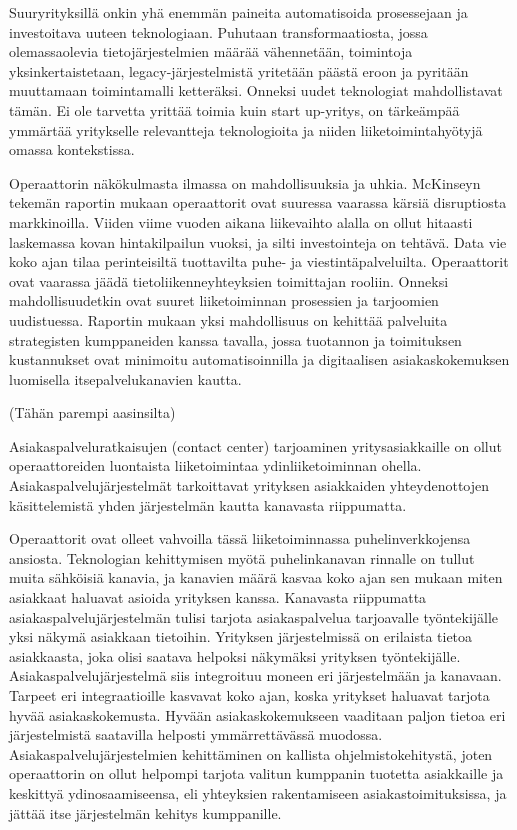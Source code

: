 \documentclass[finnish,12pt,a4paper,pdftex]{article}
\begin{document}
Suuryrityksillä onkin yhä enemmän paineita automatisoida prosessejaan ja investoitava uuteen teknologiaan. Puhutaan transformaatiosta, jossa olemassaolevia tietojärjestelmien määrää vähennetään, toimintoja yksinkertaistetaan,  legacy-järjestelmistä yritetään päästä eroon ja pyritään muuttamaan toimintamalli ketteräksi. Onneksi uudet teknologiat mahdollistavat tämän. Ei ole tarvetta yrittää toimia kuin start up-yritys, on tärkeämpää ymmärtää yritykselle relevantteja teknologioita ja niiden liiketoimintahyötyjä omassa kontekstissa. \citep{lamoureux}

Operaattorin näkökulmasta ilmassa on mahdollisuuksia ja uhkia. McKinseyn tekemän raportin mukaan operaattorit ovat suuressa vaarassa kärsiä disruptiosta markkinoilla. Viiden viime vuoden aikana liikevaihto alalla on ollut hitaasti laskemassa kovan hintakilpailun vuoksi, ja silti investointeja on tehtävä. Data vie koko ajan tilaa perinteisiltä tuottavilta puhe- ja viestintäpalveluilta. Operaattorit ovat vaarassa jäädä tietoliikenneyhteyksien toimittajan rooliin. Onneksi mahdollisuudetkin ovat suuret liiketoiminnan prosessien ja tarjoomien uudistuessa. Raportin mukaan yksi mahdollisuus on kehittää palveluita strategisten kumppaneiden kanssa tavalla, jossa tuotannon ja toimituksen kustannukset ovat minimoitu automatisoinnilla ja digitaalisen asiakaskokemuksen luomisella itsepalvelukanavien kautta.\citep{mckinseytele}

(Tähän parempi aasinsilta)

Asiakaspalveluratkaisujen (contact center) tarjoaminen yritysasiakkaille on ollut operaattoreiden luontaista liiketoimintaa ydinliiketoiminnan ohella. Asiakaspalvelujärjestelmät tarkoittavat yrityksen asiakkaiden yhteydenottojen käsittelemistä yhden järjestelmän kautta kanavasta riippumatta.

Operaattorit ovat olleet vahvoilla tässä liiketoiminnassa puhelinverkkojensa ansiosta. Teknologian kehittymisen myötä puhelinkanavan rinnalle on tullut muita sähköisiä kanavia, ja kanavien määrä kasvaa koko ajan sen mukaan miten asiakkaat haluavat asioida yrityksen kanssa. Kanavasta riippumatta asiakaspalvelujärjestelmän tulisi tarjota asiakaspalvelua tarjoavalle työntekijälle yksi näkymä asiakkaan tietoihin. Yrityksen järjestelmissä on erilaista tietoa asiakkaasta, joka olisi saatava helpoksi näkymäksi yrityksen työntekijälle. Asiakaspalvelujärjestelmä siis integroituu moneen eri järjestelmään ja kanavaan. Tarpeet eri integraatioille kasvavat koko ajan, koska yritykset haluavat tarjota hyvää asiakaskokemusta. Hyvään asiakaskokemukseen vaaditaan paljon tietoa eri järjestelmistä saatavilla helposti ymmärrettävässä muodossa. Asiakaspalvelujärjestelmien kehittäminen on kallista ohjelmistokehitystä, joten operaattorin on ollut helpompi tarjota valitun kumppanin tuotetta asiakkaille ja keskittyä ydinosaamiseensa, eli yhteyksien rakentamiseen asiakastoimituksissa, ja jättää itse järjestelmän kehitys kumppanille. 
\end{document}
